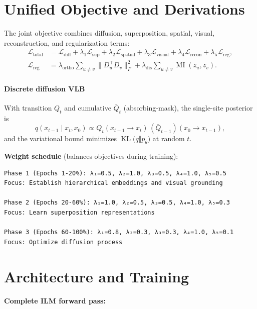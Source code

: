 \documentclass[11pt]{article}
\begin{document}
\section{Unified Objective and Derivations}
The joint objective combines diffusion, superposition, spatial, visual, reconstruction, and regularization terms:
\begin{align}
\mathcal{L}_{\text{total}}
&= \mathcal{L}_{\text{diff}}
 + \lambda_1 \mathcal{L}_{\text{sup}}
 + \lambda_2 \mathcal{L}_{\text{spatial}}
 + \lambda_3 \mathcal{L}_{\text{visual}}
 + \lambda_4 \mathcal{L}_{\text{recon}}
 + \lambda_5 \mathcal{L}_{\text{reg}}, \\[-2pt]
\mathcal{L}_{\text{reg}} &= \lambda_{\text{ortho}} \sum_{u\neq v}\|D_u^\top D_v\|_F^2 + \lambda_{\text{dis}}\sum_{u\neq v} \operatorname{MI}(z_u,z_v).
\end{align}
\paragraph{Discrete diffusion VLB} With transition $Q_t$ and cumulative $\bar{Q}_t$ (absorbing-mask), the single-site posterior is
\begin{equation}
  q(x_{t-1}\mid x_t,x_0) \propto Q_t(x_{t-1}\to x_t)\,(\bar{Q}_{t-1})(x_0\to x_{t-1}),
\end{equation}
and the variational bound minimizes $\operatorname{KL}\big(q\Vert p_\theta\big)$ at random $t$.

\textbf{Weight schedule} (balances objectives during training):

\begin{verbatim}
Phase 1 (Epochs 1-20%): λ₁=0.5, λ₂=1.0, λ₃=0.5, λ₄=1.0, λ₅=0.5
Focus: Establish hierarchical embeddings and visual grounding

Phase 2 (Epochs 20-60%): λ₁=1.0, λ₂=0.5, λ₃=0.5, λ₄=1.0, λ₅=0.3
Focus: Learn superposition representations

Phase 3 (Epochs 60-100%): λ₁=0.8, λ₂=0.3, λ₃=0.3, λ₄=1.0, λ₅=0.1
Focus: Optimize diffusion process
\end{verbatim}

\section{Architecture and Training}

\textbf{Complete ILM forward pass:}
\end{document}
